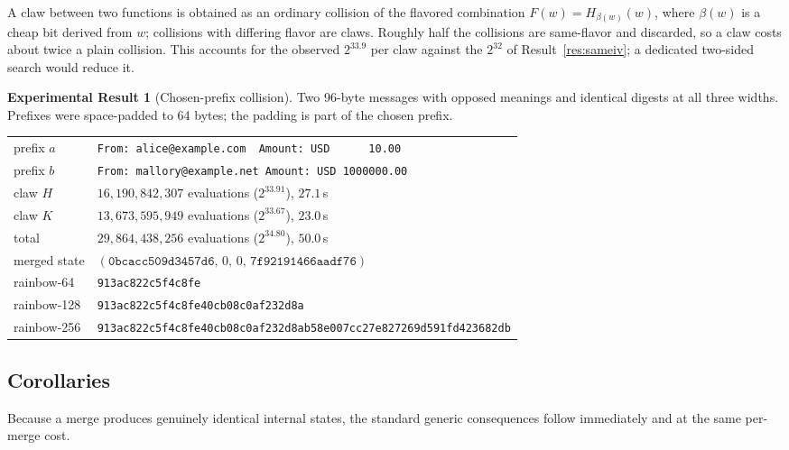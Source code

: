 \documentclass[10pt]{article}
\theoremstyle{definition}
\newtheorem{result}{Experimental Result}
\newcommand{\code}[1]{\texttt{#1}}
\begin{document}
A claw between two functions is obtained as an ordinary collision of the flavored combination $F(w) = H_{\beta(w)}(w)$, where $\beta(w)$ is a cheap bit derived from $w$; collisions with differing flavor are claws. Roughly half the collisions are same-flavor and discarded, so a claw costs about twice a plain collision. This accounts for the observed $2^{33.9}$ per claw against the $2^{32}$ of Result~\ref{res:sameiv}; a dedicated two-sided search would reduce it.

\begin{result}[Chosen-prefix collision]
\label{res:chosenprefix}
Two 96-byte messages with opposed meanings and identical digests at all three widths. Prefixes were space-padded to 64 bytes; the padding is part of the chosen prefix.
\begin{center}\footnotesize
\begin{tabularx}{\linewidth}{@{}lX@{}}
\toprule
prefix $a$ & \code{From: alice@example.com\ \ Amount: USD\ \ \ \ \ \ 10.00} \\
prefix $b$ & \code{From: mallory@example.net Amount: USD 1000000.00} \\
\midrule
claw $H$ & $16{,}190{,}842{,}307$ evaluations ($2^{33.91}$), $27.1$\,s \\
claw $K$ & $13{,}673{,}595{,}949$ evaluations ($2^{33.67}$), $23.0$\,s \\
total    & $29{,}864{,}438{,}256$ evaluations ($2^{34.80}$), $50.0$\,s \\
\midrule
merged state & $(\code{0bcacc509d3457d6},\,0,\,0,\,\code{7f92191466aadf76})$ \\
rainbow-64  & \code{913ac822c5f4c8fe} \\
rainbow-128 & \code{913ac822c5f4c8fe40cb08c0af232d8a} \\
rainbow-256 & \code{913ac822c5f4c8fe40cb08c0af232d8ab58e007cc27e827269d591fd423682db} \\
\bottomrule
\end{tabularx}
\end{center}
\end{result}

\subsection{Corollaries}

Because a merge produces genuinely identical internal states, the standard generic consequences follow immediately and at the same per-merge cost.
\end{document}
